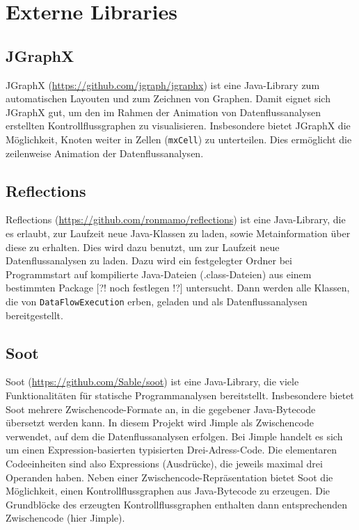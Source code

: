 \newpage
\section{Externe Libraries}

\subsection{JGraphX}

JGraphX (\url{https://github.com/jgraph/jgraphx}) ist eine Java-Library zum automatischen Layouten und zum Zeichnen von Graphen. 
Damit eignet sich JGraphX gut, um den im Rahmen der Animation von Datenflussanalysen erstellten Kontrollflussgraphen zu visualisieren. Insbesondere bietet JGraphX die Möglichkeit, Knoten weiter in Zellen (\lstinline{mxCell}) zu unterteilen.
Dies ermöglicht die zeilenweise Animation der Datenflussanalysen.

\subsection{Reflections}

Reflections (\url{https://github.com/ronmamo/reflections}) ist eine Java-Library, die es erlaubt, zur Laufzeit neue Java-Klassen zu laden, sowie Metainformation über diese zu erhalten.
Dies wird dazu benutzt, um zur Laufzeit neue Datenflussanalysen zu laden.
Dazu wird ein festgelegter Ordner bei Programmstart auf kompilierte Java-Dateien (.class-Dateien) aus einem bestimmten Package [?! noch festlegen !?] untersucht. 
Dann werden alle Klassen, die von \lstinline{DataFlowExecution} erben, geladen und als Datenflussanalysen bereitgestellt. 


\subsection{Soot}

Soot (\url{https://github.com/Sable/soot}) ist eine Java-Library, die viele Funktionalitäten für statische Programmanalysen bereitstellt. 
Insbesondere bietet Soot mehrere Zwischencode-Formate an, in die gegebener Java-Bytecode übersetzt werden kann. 
In diesem Projekt wird Jimple als Zwischencode verwendet, auf dem die Datenflussanalysen erfolgen.
Bei Jimple handelt es sich um einen Expression-basierten typisierten Drei-Adress-Code.
Die elementaren Codeeinheiten sind also Expressions (Ausdrücke), die jeweils maximal drei Operanden haben.
Neben einer Zwischencode-Repräsentation bietet Soot die Möglichkeit, einen Kontrollflussgraphen aus Java-Bytecode zu erzeugen.
Die Grundblöcke des erzeugten Kontrollflussgraphen enthalten dann entsprechenden Zwischencode (hier Jimple).